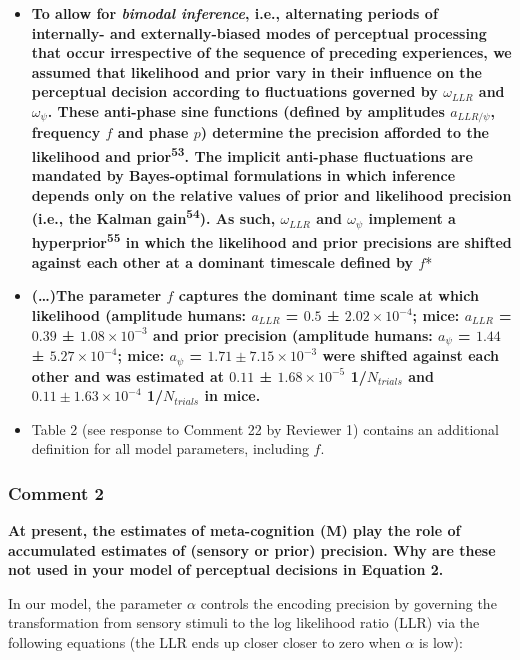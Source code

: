 \documentclass[
]{article}
\begin{document}
\begin{itemize}
\item
  \textbf{To allow for \emph{bimodal inference}, i.e., alternating
  periods of internally- and externally-biased modes of perceptual
  processing that occur irrespective of the sequence of preceding
  experiences, we assumed that likelihood and prior vary in their
  influence on the perceptual decision according to fluctuations
  governed by \(\omega_{LLR}\) and \(\omega_{\psi}\). These anti-phase
  sine functions (defined by amplitudes \(a_{LLR/\psi}\), frequency
  \(f\) and phase \(p\)) determine the precision afforded to the
  likelihood and prior\textsuperscript{53}. The implicit anti-phase
  fluctuations are mandated by Bayes-optimal formulations in which
  inference depends only on the relative values of prior and likelihood
  precision (i.e., the Kalman gain\textsuperscript{54}). As such,
  \(\omega_{LLR}\) and \(\omega_{\psi}\) implement a
  hyperprior\textsuperscript{55} in which the likelihood and prior
  precisions are shifted against each other at a dominant timescale
  defined by \(f\)}*
\item
  \textbf{(\ldots)The parameter \(f\) captures the dominant time scale
  at which likelihood (amplitude humans: \(a_{LLR}\) = \(0.5\) ±
  \(\ensuremath{2.02\times 10^{-4}}\); mice: \(a_{LLR}\) = \(0.39\) ±
  \(\ensuremath{1.08\times 10^{-3}}\) and prior precision (amplitude
  humans: \(a_{\psi}\) = \(1.44\) ± \(\ensuremath{5.27\times 10^{-4}}\);
  mice: \(a_{\psi}\) = \(1.71 ± \ensuremath{7.15\times 10^{-3}}\) were
  shifted against each other and was estimated at \(0.11\) ±
  \(\ensuremath{1.68\times 10^{-5}}\) 1/\(N_{trials}\) and
  \(0.11 ± \ensuremath{1.63\times 10^{-4}}\) 1/\(N_{trials}\) in mice.}
\item
  Table 2 (see response to Comment 22 by Reviewer 1) contains an
  additional definition for all model parameters, including \(f\).
\end{itemize}

\hypertarget{comment-2}{%
\subsubsection{Comment 2}\label{comment-2}}

\textbf{At present, the estimates of meta-cognition (M) play the role of
accumulated estimates of (sensory or prior) precision. Why are these not
used in your model of perceptual decisions in Equation 2.}

In our model, the parameter \(\alpha\) controls the encoding precision
by governing the transformation from sensory stimuli to the log
likelihood ratio (LLR) via the following equations (the LLR ends up
closer closer to zero when \(\alpha\) is low):
\end{document}
